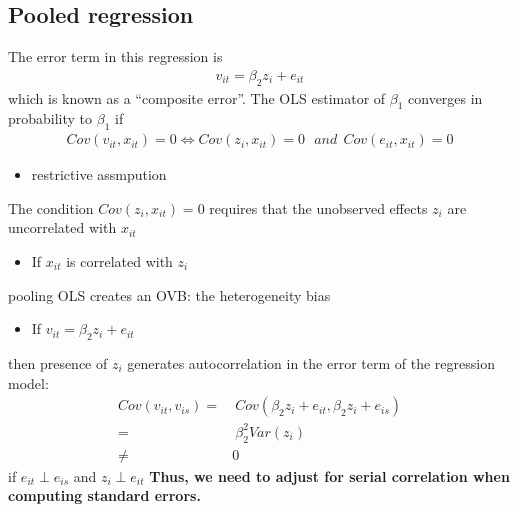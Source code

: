 \documentclass[a4paper,twoside,11pt]{article}
\begin{document}
\subsection{Pooled regression}
The error term in this regression is
\begin{equation*}
\begin{aligned}
v_{it} = \beta_2 z_i + e_{it}
\end{aligned}
\end{equation*}
which is known as a “composite error”.
\newline
\newline
The OLS estimator of $\beta_1$ converges in probability to $\beta_1$ if 
\begin{equation*}
\begin{aligned}
Cov(v_{it}, x_{it} ) = 0 \Leftrightarrow Cov(z_i, x_{it} ) =  0 \ \ \ and \ \ Cov(e_{it} , x_{it} ) = 0
\end{aligned}
\end{equation*}
\begin{itemize}
    \item \textcolor{NavyBlue}{restrictive assmpution}
\end{itemize}
The condition $Cov(z_i, x_{it}) =0$ requires that the unobserved effects $z_i$ are uncorrelated with $x_{it}$
\begin{itemize}
    \item If $x_{it}$ is correlated with $z_i$
\end{itemize}
pooling OLS creates an OVB: the heterogeneity bias
\begin{itemize}
    \item If $v_{it} = \beta_2 z_i + e_{it}$
\end{itemize}
then presence of $z_i$ generates autocorrelation in the error term of the regression model:
\begin{equation*}
\begin{aligned}
Cov(v_{it}, v_{is}) =& \  Cov(\beta_2 z_i + e_{it},\beta_2 z_i + e_{is} ) \\
=& \ \beta_2^2 Var(z_i) \\
\ne & 0 
\end{aligned}
\end{equation*}
if $e_{it} \perp e_{is}$ and $z_i \perp e_{it}$ 
\newline
\textbf{Thus, we need to adjust for serial correlation when computing standard errors.}
\end{document}
